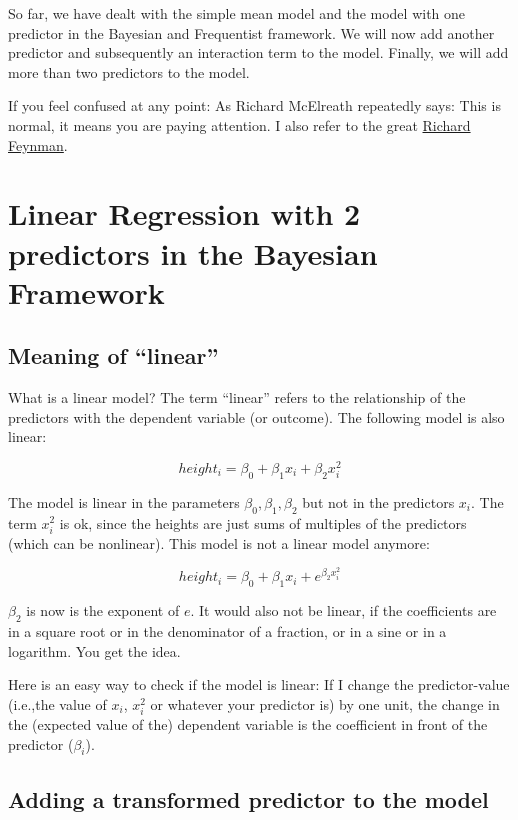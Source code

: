 \documentclass[
]{book}
\begin{document}
So far, we have dealt with the simple mean model and the model with one predictor
in the Bayesian and Frequentist framework.
We will now add another predictor and subsequently an interaction term to the model.
Finally, we will add more than two predictors to the model.

If you feel confused at any point: As Richard McElreath repeatedly says:
This is normal, it means you are paying attention. I also refer to the
great \href{https://www.youtube.com/watch?v=lytxafTXg6c&ab_channel=sdfhsfh}{Richard Feynman}.

\section{Linear Regression with 2 predictors in the Bayesian Framework}\label{linear-regression-with-2-predictors-in-the-bayesian-framework}

\subsection{Meaning of ``linear''}\label{meaning-of-linear}

What is a linear model? The term ``linear'' refers to the relationship of the predictors
with the dependent variable (or outcome). The following model is also linear:

\[height_i = \beta_0 + \beta_1 x_i + \beta_2 x_i^2\]

The model is linear in the parameters \(\beta_0, \beta_1, \beta_2\) but not in the predictors \(x_i\).
The term \(x_i^2\) is ok, since the heights are just sums of multiples of the predictors (which can be nonlinear).
This model is not a linear model anymore:

\[height_i = \beta_0 + \beta_1 x_i + e^{\beta_2 x_i^2}\]

\(\beta_2\) is now is the exponent of \(e\). It would also not be linear,
if the coefficients are in a square root or in the denominator of a fraction,
or in a sine or in a logarithm. You get the idea.

Here is an easy way to check if the model is linear: If I change the predictor-value
(i.e.,the value of \(x_i\), \(x_i^2\) or whatever your predictor is) by one unit,
the change in the (expected value of the) dependent variable is the coefficient in front of
the predictor (\(\beta_i\)).

\subsection{Adding a transformed predictor to the model}\label{adding_transformed_predictor}
\end{document}
